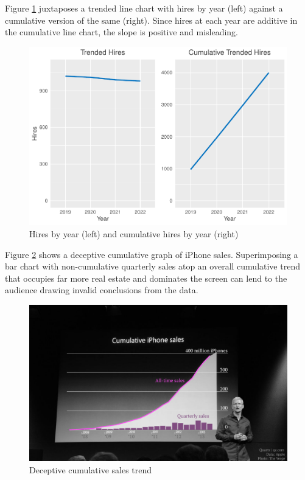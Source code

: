 \documentclass[
]{book}
\begin{document}
Figure \ref{fig:cum-hires-trend} juxtaposes a trended line chart with hires by year (left) against a cumulative version of the same (right). Since hires at each year are additive in the cumulative line chart, the slope is positive and misleading.

\begin{figure}

{\centering \includegraphics[width=1\linewidth]{The_Fundamentals_of_People_Analytics_files/figure-latex/cum-hires-trend-1} 

}

\caption{Hires by year (left) and cumulative hires by year (right)}\label{fig:cum-hires-trend}
\end{figure}

Figure \ref{fig:cum-iphone-sales} shows a deceptive cumulative graph of iPhone sales. Superimposing a bar chart with non-cumulative quarterly sales atop an overall cumulative trend that occupies far more real estate and dominates the screen can lend to the audience drawing invalid conclusions from the data.

\begin{figure}

{\centering \includegraphics[width=0.75\linewidth]{graphics/bad_viz-cumulative_trend} 

}

\caption{Deceptive cumulative sales trend}\label{fig:cum-iphone-sales}
\end{figure}
\end{document}
